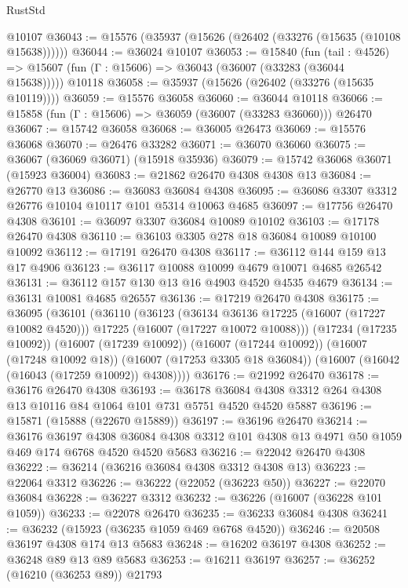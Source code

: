 \begin{lexlean}{RustStd}
\begin{coremodule}
    @10107
@36043 := @15576 (@35937 (@15626 (@26402 (@33276 (@15635 (@10108 @15638))))))
@36044 := @36024 @10107
@36053 := @15840
    (fun (tail : @4526) => @15607 (fun (Γ : @15606) => @36043 (@36007 (@33283 (@36044 @15638)))))
    @10118
@36058 := @35937 (@15626 (@26402 (@33276 (@15635 @10119))))
@36059 := @15576 @36058
@36060 := @36044 @10118
@36066 := @15858 (fun (Γ : @15606) => @36059 (@36007 (@33283 @36060))) @26470
@36067 := @15742 @36058
@36068 := @36005 @26473
@36069 := @15576 @36068
@36070 := @26476 @33282
@36071 := @36070 @36060
@36075 := @36067 (@36069 @36071) (@15918 @35936)
@36079 := @15742 @36068 @36071 (@15923 @36004)
@36083 := @21862 @26470 @4308 @4308 @13
@36084 := @26770 @13
@36086 := @36083 @36084 @4308
@36095 := @36086 @3307 @3312 @26776 @10104 @10117 @101 @5314 @10063 @4685
@36097 := @17756 @26470 @4308
@36101 := @36097 @3307 @36084 @10089 @10102
@36103 := @17178 @26470 @4308
@36110 := @36103 @3305 @278 @18 @36084 @10089 @10100 @10092
@36112 := @17191 @26470 @4308
@36117 := @36112 @144 @159 @13 @17 @4906
@36123 := @36117 @10088 @10099 @4679 @10071 @4685 @26542
@36131 := @36112 @157 @130 @13 @16 @4903 @4520 @4535 @4679
@36134 := @36131 @10081 @4685 @26557
@36136 := @17219 @26470 @4308
@36175 := @36095
    (@36101
      (@36110
        (@36123
          (@36134 @36136 @17225 (@16007 (@17227 @10082 @4520)))
          @17225
          (@16007 (@17227 @10072 @10088)))
        (@17234 (@17235 @10092))
        (@16007 (@17239 @10092))
        (@16007 (@17244 @10092))
        (@16007 (@17248 @10092 @18))
        (@16007 (@17253 @3305 @18 @36084))
        (@16007 (@16042 (@16043 (@17259 @10092)) @4308))))
@36176 := @21992 @26470
@36178 := @36176 @26470 @4308
@36193 := @36178
    @36084
    @4308
    @3312
    @264
    @4308
    @13
    @10116
    @84
    @1064
    @101
    @731
    @5751
    @4520
    @4520
    @5887
@36196 := @15871 (@15888 (@22670 @15889))
@36197 := @36196 @26470
@36214 := @36176
    @36197
    @4308
    @36084
    @4308
    @3312
    @101
    @4308
    @13
    @4971
    @50
    @1059
    @469
    @174
    @6768
    @4520
    @4520
    @5683
@36216 := @22042 @26470 @4308
@36222 := @36214 (@36216 @36084 @4308 @3312 @4308 @13)
@36223 := @22064 @3312
@36226 := @36222 (@22052 (@36223 @50))
@36227 := @22070 @36084
@36228 := @36227 @3312
@36232 := @36226 (@16007 (@36228 @101 @1059))
@36233 := @22078 @26470
@36235 := @36233 @36084 @4308
@36241 := @36232 (@15923 (@36235 @1059 @469 @6768 @4520))
@36246 := @20508 @36197 @4308 @174 @13 @5683
@36248 := @16202 @36197 @4308
@36252 := @36248 @89 @13 @89 @5683
@36253 := @16211 @36197
@36257 := @36252 (@16210 (@36253 @89)) @21793

\end{coremodule}
\end{lexlean}
